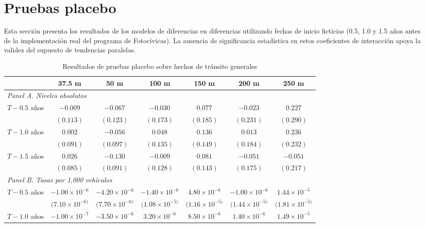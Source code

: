 \clearpage
\section{Pruebas placebo}
\label{sec:pruebas-placebo}
\noindent Esta sección presenta los resultados de los modelos de diferencias en diferencias utilizando fechas de inicio ficticias (0.5, 1.0 y 1.5 años antes de la implementación real del programa de Fotocívicas). La ausencia de significancia estadística en estos coeficientes de interacción apoya la validez del supuesto de tendencias paralelas.

\begin{table}[htbp]
    \centering
    \caption{Resultados de pruebas placebo sobre hechos de tránsito generales}
    \label{tab:placebo-general}
    \footnotesize
    \begin{adjustbox}{max width=\textwidth}
    \begin{tabular}{lcccccc}
        \toprule
        & 37.5 m & 50 m & 100 m & 150 m & 200 m & 250 m \\
        \midrule
        \multicolumn{7}{l}{\textit{Panel A. Niveles absolutos}} \\
        $T - 0.5$ años & $-0.009$ & $-0.067$ & $-0.030$ & $0.077$ & $-0.023$ & $0.227$ \\
         & $(0.113)$ & $(0.123)$ & $(0.173)$ & $(0.185)$ & $(0.231)$ & $(0.290)$ \\
        $T - 1.0$ años & $0.002$ & $-0.056$ & $0.048$ & $0.136$ & $0.013$ & $0.236$ \\
         & $(0.091)$ & $(0.097)$ & $(0.135)$ & $(0.149)$ & $(0.184)$ & $(0.232)$ \\
        $T - 1.5$ años & $0.026$ & $-0.130$ & $-0.009$ & $0.081$ & $-0.051$ & $-0.051$ \\
         & $(0.085)$ & $(0.091)$ & $(0.128)$ & $(0.143)$ & $(0.175)$ & $(0.217)$ \\
        \midrule
        \multicolumn{7}{l}{\textit{Panel B. Tasas por 1,000 vehículos}} \\
        $T - 0.5$ años & $-1.00\times 10^{-6}$ & $-4.20\times 10^{-6}$ & $-1.40\times 10^{-6}$ & $4.80\times 10^{-6}$ & $-1.00\times 10^{-6}$ & $1.44\times 10^{-5}$ \\
         & $(7.10\times 10^{-6)}$ & $(7.70\times 10^{-6)}$ & $(1.08\times 10^{-5)}$ & $(1.16\times 10^{-5)}$ & $(1.44\times 10^{-5)}$ & $(1.81\times 10^{-5)}$ \\
        $T - 1.0$ años & $-1.00\times 10^{-7}$ & $-3.50\times 10^{-6}$ & $3.20\times 10^{-6}$ & $8.50\times 10^{-6}$ & $1.40\times 10^{-6}$ & $1.49\times 10^{-5}$ \\

\end{tabular}
\end{adjustbox}
\end{table}
